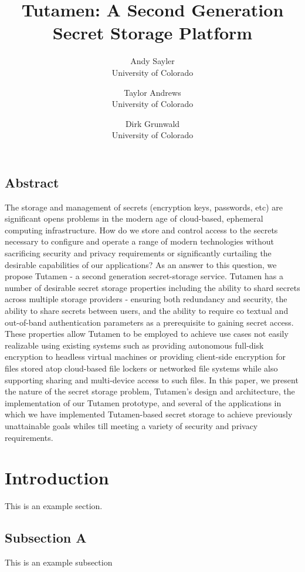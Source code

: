 \documentclass[letterpaper,twocolumn,10pt]{article}
\begin{document}
\date{}

\title{\Large \bf Tutamen: A Second Generation Secret Storage Platform}

\author{
{\rm Andy Sayler}\\
University of Colorado
\and
{\rm Taylor Andrews}\\
University of Colorado
\and
{\rm Dirk Grunwald}\\
University of Colorado
} %

\maketitle


\subsection*{Abstract}

The storage and management of secrets (encryption keys, passwords,
etc) are significant opens problems in the modern age of cloud-based,
ephemeral computing infrastructure. How do we store and control access
to the secrets necessary to configure and operate a range of modern
technologies without sacrificing security and privacy requirements or
significantly curtailing the desirable capabilities of our
applications? As an answer to this question, we propose Tutamen - a
second generation secret-storage service. Tutamen has a number of
desirable secret storage properties including the ability to shard
secrets across multiple storage providers - ensuring both redundancy
and security, the ability to share secrets between users, and the
ability to require co textual and out-of-band authentication
parameters as a prerequisite to gaining secret access. These
properties allow Tutamen to be employed to achieve use cases not
easily realizable using existing systems such as providing autonomous
full-disk encryption to headless virtual machines or providing
client-side encryption for files stored atop cloud-based file lockers
or networked file systems while also supporting sharing and
multi-device access to such files. In this paper, we present the
nature of the secret storage problem, Tutamen's design and
architecture, the implementation of our Tutamen prototype, and several
of the applications in which we have implemented Tutamen-based secret
storage to achieve previously unattainable goals whiles till meeting a
variety of security and privacy requirements.

\section{Introduction}
\label{sec:introduction}

This is an example section.

\subsection{Subsection A}
\label{sec:section1A}

This is an example subsection

{
  \footnotesize
  
  
}
\end{document}
